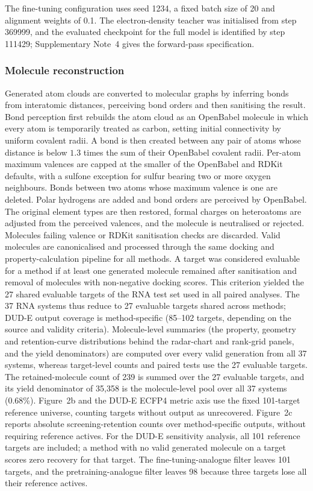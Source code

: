 \documentclass[pdflatex,sn-mathphys-num]{sn-jnl}
\theoremstyle{thmstyleone}
\theoremstyle{thmstyletwo}
\theoremstyle{thmstylethree}
\begin{document}
The fine-tuning configuration uses seed 1234, a fixed batch size of 20 and alignment weights of 0.1. The electron-density teacher was initialised from step 369999, and the evaluated checkpoint for the full model is identified by step 111429; Supplementary Note~4 gives the forward-pass specification.

\subsubsection{Molecule reconstruction}

Generated atom clouds are converted to molecular graphs by inferring bonds from interatomic distances, perceiving bond orders and then sanitising the result. Bond perception first rebuilds the atom cloud as an OpenBabel molecule in which every atom is temporarily treated as carbon, setting initial connectivity by uniform covalent radii. A bond is then created between any pair of atoms whose distance is below $1.3$ times the sum of their OpenBabel covalent radii. Per-atom maximum valences are capped at the smaller of the OpenBabel and RDKit defaults, with a sulfone exception for sulfur bearing two or more oxygen neighbours. Bonds between two atoms whose maximum valence is one are deleted. Polar hydrogens are added and bond orders are perceived by OpenBabel. The original element types are then restored, formal charges on heteroatoms are adjusted from the perceived valences, and the molecule is neutralised or rejected. Molecules failing valence or RDKit sanitisation checks are discarded. Valid molecules are canonicalised and processed through the same docking and property-calculation pipeline for all methods. A target was considered evaluable for a method if at least one generated molecule remained after sanitisation and removal of molecules with non-negative docking scores. This criterion yielded the 27 shared evaluable targets of the RNA test set used in all paired analyses. The 37 RNA systems thus reduce to 27 evaluable targets shared across methods; DUD-E output coverage is method-specific (85--102 targets, depending on the source and validity criteria). Molecule-level summaries (the property, geometry and retention-curve distributions behind the radar-chart and rank-grid panels, and the yield denominators) are computed over every valid generation from all 37 systems, whereas target-level counts and paired tests use the 27 evaluable targets. The retained-molecule count of 239 is summed over the 27 evaluable targets, and its yield denominator of 35,358 is the molecule-level pool over all 37 systems (0.68\%). Figure~2b and the DUD-E ECFP4 metric axis use the fixed 101-target reference universe, counting targets without output as unrecovered. Figure~2c reports absolute screening-retention counts over method-specific outputs, without requiring reference actives. For the DUD-E sensitivity analysis, all 101 reference targets are included; a method with no valid generated molecule on a target scores zero recovery for that target. The fine-tuning-analogue filter leaves 101 targets, and the pretraining-analogue filter leaves 98 because three targets lose all their reference actives.
\end{document}
